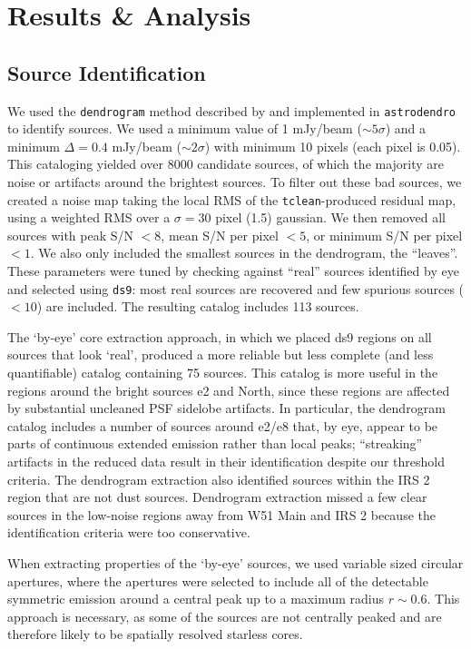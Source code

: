 \documentclass{emulateapj}
\begin{document}
\section{Results \& Analysis}
\label{sec:results}
\subsection{Source Identification}
\label{sec:sourceid}
We used the \texttt{dendrogram} method described by \citet{Rosolowsky2008c} and
implemented in \texttt{astrodendro} to identify sources.  We used a minimum
value of 1 mJy/beam ($\sim5\sigma$) and a minimum $\Delta=0.4$ mJy/beam
($\sim2\sigma$) with minimum 10 pixels (each pixel is 0.05\arcsec).  This
cataloging yielded over 8000 candidate sources, of which the majority are noise
or artifacts around the brightest sources.  To filter out these bad sources,
we created a noise map taking the local RMS of the \texttt{tclean}-produced
residual map, using a weighted RMS over a $\sigma=30$ pixel (1.5\arcsec)
gaussian.  We then removed
all sources with peak S/N $< 8$, mean S/N per pixel $< 5$, or minimum S/N per
pixel $ < 1$.  We also only included the smallest sources in the dendrogram,
the ``leaves''.  These parameters were tuned by checking against ``real''
sources identified by eye and selected using \texttt{ds9}: most real sources are
recovered and few spurious sources ($<10$) are
included.  The resulting catalog includes 113 sources.

The `by-eye' core extraction approach, in which we placed ds9 regions on all
sources that look `real', produced a more reliable but less complete (and less
quantifiable) catalog containing 75 sources.  This catalog is more useful in
the regions around the bright sources e2 and North, since these regions are
affected by substantial uncleaned PSF sidelobe artifacts.  In particular, the
dendrogram catalog includes a number of sources around e2/e8 that, by eye,
appear to be parts of continuous extended emission rather than local peaks;
``streaking'' artifacts in the reduced data result in their identification
despite our threshold criteria.  The dendrogram extraction also identified
sources within the IRS 2 \hii region that are not dust sources.  Dendrogram
extraction missed a few clear sources in the low-noise regions away from
W51 Main and IRS 2 because the identification criteria were too conservative.

When extracting properties of the `by-eye' sources, we used variable sized
circular apertures, where the apertures were selected to include all of the
detectable symmetric emission around a central peak up to a maximum radius
$r\sim0.6$\arcsec.  This approach is necessary, as some of the sources are not
centrally peaked and are therefore likely to be spatially resolved starless
cores.
\end{document}
